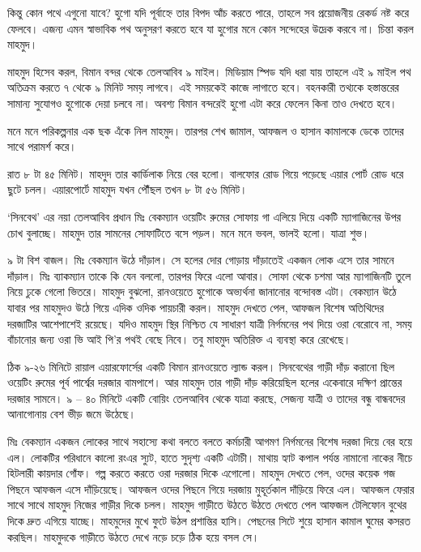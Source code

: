 \documentclass[
]{book}
\begin{document}
কিন্তু কোন পথে এগুনো যাবে? হুগো যদি পূর্বাহ্নে তার বিপদ আঁচ করতে পারে, তাহলে সব প্রয়োজনীয় রেকর্ড নষ্ট করে ফেলবে। এজন্য এমন স্বাভাবিক পথ অনুসরণ করতে হবে যা হুগোর মনে কোন সন্দেহের উদ্রেক করবে না। চিন্তা করল মাহমুদ।

মাহমুদ হিসেব করল, বিমান বন্দর থেকে তেলআবিব ৯ মাইল। মিডিয়াম স্পিড যদি ধরা যায় তাহলে এই ৯ মাইল পথ অতিক্রম করতে ৭ থেকে ৯ মিনিট সময় লাগবে। এই সময়কেই কাজে লাগাতে হবে। বহনকারী তথ্যকে হস্তান্তরের সামান্য সুযোগও হুগোকে দেয়া চলবে না। অবশ্য বিমান বন্দরেই হুগো এটা করে ফেলেন কিনা তাও দেখতে হবে।

মনে মনে পরিকল্পনার এক ছক এঁকে নিল মাহমুদ। তারপর শেখ জামাল, আফজল ও হাসান কামালকে ডেকে তাদের সাথে পরামর্শ করে।

রাত ৮ টা ৪৫ মিনিট। মাহদুদ তার কার্ডিলাক নিয়ে বের হলো। বালফোর রোড গিয়ে পড়েছে এয়ার পোর্ট রোড ধরে ছুটে চলল। এয়ারপোর্টে মাহমুদ যখন পৌঁছল তখন ৮ টা ৫৬ মিনিট।

`সিনবেথ' এর নয়া তেলআবিব প্রধান মিঃ বেকম্যান ওয়েটিং রুমের সোফায় গা এলিয়ে দিয়ে একটি ম্যাগাজিনের উপর চোখ বুলাচ্ছে। মাহমুদ তার সামনের সোফাটিতে বসে পড়ল। মনে মনে ভবল, ভালই হলো। যাত্রা শুভ।

৯ টা বিশ বাজল। মিঃ বেকম্যান উঠে দাঁড়াল। সে হলের দোর গোড়ায় দাঁড়াতেই একজন লোক এসে তার সামনে দাঁড়াল। মিঃ ব্যাকম্যান তাকে কি যেন বললো, তারপর ফিরে এলো আবার। সোফা থেকে চশমা আর ম্যাগাজিনটি তুলে নিয়ে ঢুকে গেলো ভিতরে। মাহমুদ বুঝলো, রানওয়েতে হুগোকে অভ্যর্থনা জানানোর বন্দোবস্ত এটা। বেকম্যান উঠে যাবার পর মাহমুদও উঠে গিয়ে এদিক ওদিক পায়চারী করল। মাহমুদ দেখতে পেল, আফজল বিশেষ অতিথিদের দরজাটির আশেপাশেই রয়েছে। যদিও মাহমুদ স্থির নিশ্চিত যে সাধারণ যাত্রী নির্গমনের পথ দিয়ে ওরা বেরোবে না, সময় বাঁচানোর জন্য ওরা ভি আই পি'র পথই বেছে নিবে। তবু মাহমুদ অতিরিক্ত এ ব্যবস্থা করে রেখেছে।

ঠিক ৯-২৬ মিনিটে রায়াল এয়ারফোর্সের একটি বিমান রানওয়েতে ল্যান্ড করল। সিনবেথের গাড়ী দাঁড় করানো ছিল ওয়েটিং রুমের পূর্ব পার্শ্বের দরজার বামপাশে। আর মাহমুদ তার গাড়ী দাঁড় করিয়েছিল হলের একেবারে দক্ষিণ প্রান্তের দরজার সামনে। ৯ -- ৪০ মিনিটে একটি বোয়িং তেলআবিব থেকে যাত্রা করছে, সেজন্য যাত্রী ও তাদের বন্ধু বান্ধবদের আনাগোনায় বেশ ভীড় জমে উঠেছে।

মিঃ বেকম্যান একজন লোকের সাথে সহাস্যে কথা বলতে বলতে কর্মচারী আগমণ নির্গমনের বিশেষ দরজা দিয়ে বের হয়ে এল। লোকটির পরিধানে কালো রংএর স্যুট, হাতে সুদৃশ্য একটি এটাচী। মাথায় হ্যাট কপাল পর্যন্ত নামানো নাকের নীচে হিটলারী কায়দার গোঁফ। গল্প করতে করতে ওরা দরজার দিকে এগোলো। মাহমুদ দেখতে পেল, ওদের কয়েক গজ পিছনে আফজল এসে দাঁড়িয়েছে। আফজল ওদের পিছনে গিয়ে দরজায় মুহূর্তকাল দাঁড়িয়ে ফিরে এল। আফজল ফেরার সাথে সাথে মাহমুদ নিজের গাড়ীর দিকে চলল। মাহমুদ গাড়ীতে উঠতে উঠতে দেখতে পেল আফজল টেলিফোন বুথের দিকে দ্রুত এগিয়ে যাচ্ছে। মাহমুদের মুখে ফুটে উঠল প্রশান্তির হাসি। পেছনের সিটে শুয়ে হাসান কামাল ঘুমের কসরত করছিল। মাহমুদকে গাড়ীতে উঠতে দেখে নড়ে চড়ে ঠিক হয়ে বসল সে।
\end{document}
